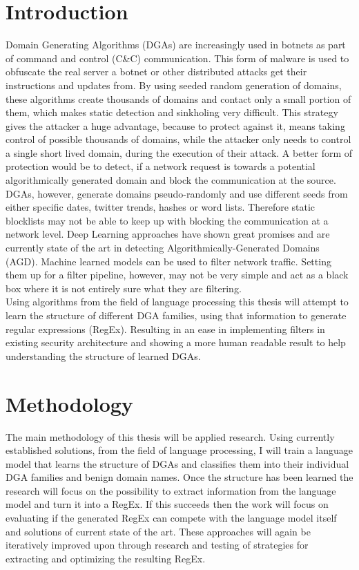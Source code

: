 \documentclass[a4paper, 12pt]{article}
\begin{document}
\section{Introduction}
Domain Generating Algorithms (DGAs) are increasingly used in botnets as part of command and control
(C\&C) communication. This form of malware is used to obfuscate the real server a botnet or other
distributed attacks get their instructions and updates from. By using seeded random generation of
domains, these algorithms create thousands of domains and contact only a small portion of them,
which makes static detection and sinkholing \cite{plohmannComprehensiveMeasurementStudy2016} very
difficult. This strategy gives the attacker a huge advantage, because to protect against it, means
taking control of possible thousands of domains, while the attacker only needs to control a single
short lived domain, during the execution of their attack. A better form of protection would be to
detect, if a network request is towards a potential algorithmically generated domain and block the
communication at the source. DGAs, however, generate domains pseudo-randomly and use different seeds from
either specific dates, twitter trends, hashes or word lists. Therefore static blocklists may not be
able to keep up with blocking the communication at a network level. Deep Learning approaches have
shown great promises and are currently state of the art in detecting Algorithmically-Generated
Domains (AGD). Machine learned models can be used to filter network traffic. Setting them up for a
filter pipeline, however, may not be very simple and act as a black box where it is not entirely
sure what they are filtering.\\ Using algorithms from the field of language processing this thesis
will attempt to learn the structure of different DGA families, using that information to generate
regular expressions (RegEx). Resulting in an ease in implementing filters in existing security
architecture and showing a more human readable result to help understanding the structure of learned
DGAs.

\section{Methodology}
The main methodology of this thesis will be applied research. Using currently established solutions,
from the field of language processing, I will train a language model that learns the structure of
DGAs and classifies them into their individual DGA families and benign domain names. Once the structure has
been learned the research will focus on the possibility to extract information from the language
model and turn it into a RegEx. If this succeeds then the work will focus on evaluating if the
generated RegEx can compete with the language model itself and solutions of current state of the
art. These approaches will again be iteratively improved upon through research and testing of
strategies for extracting and optimizing the resulting RegEx.
\end{document}
